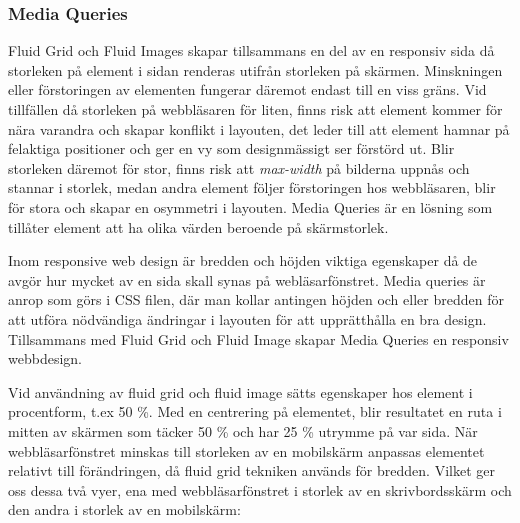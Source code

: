 \documentclass[11pt]{article}
\begin{document}
\subsubsection{Media Queries}
Fluid Grid och Fluid Images skapar tillsammans en del av en responsiv sida då storleken på element i sidan renderas utifrån storleken på skärmen. Minskningen eller förstoringen av elementen fungerar däremot endast till en viss gräns. Vid tillfällen då storleken på webbläsaren för liten, finns risk att element kommer för nära varandra och skapar konflikt i layouten, det leder till att element hamnar på felaktiga positioner och ger en vy som designmässigt ser förstörd ut. Blir storleken däremot för stor, finns risk att \textit{max-width} på bilderna uppnås och stannar i storlek, medan andra element följer förstoringen hos webbläsaren, blir för stora och skapar en osymmetri i layouten. Media Queries är en lösning som tillåter element att ha olika värden beroende på skärmstorlek.

Inom responsive web design är bredden och höjden viktiga egenskaper då de avgör hur mycket av en sida skall synas på webläsarfönstret.  Media queries är anrop som görs i CSS filen, där man kollar antingen höjden och eller bredden för att utföra nödvändiga ändringar i layouten för att upprätthålla en bra design. Tillsammans med Fluid Grid och Fluid Image skapar Media Queries en responsiv webbdesign. 

\newpage

Vid användning av fluid grid och fluid image sätts egenskaper hos element i procentform, t.ex 50 \%. Med en centrering på elementet, blir resultatet en ruta i mitten av skärmen som täcker 50 \% och har 25 \% utrymme på var sida. När webbläsarfönstret minskas till storleken av en mobilskärm anpassas elementet relativt till förändringen, då fluid grid tekniken används för bredden. Vilket ger oss dessa två vyer, ena med webbläsarfönstret i storlek av en skrivbordsskärm och den andra i storlek av en mobilskärm:
\end{document}
